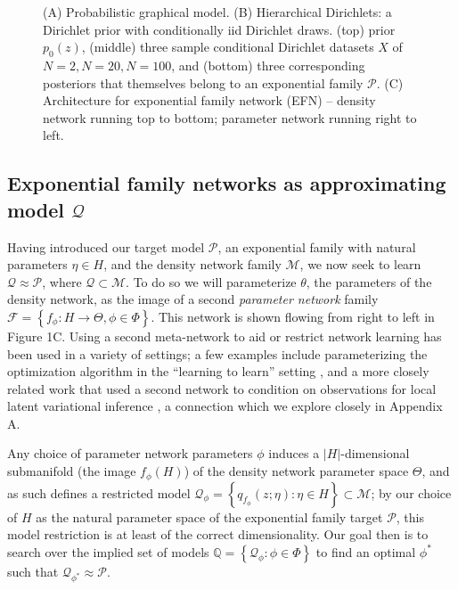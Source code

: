 \documentclass{article}
\newcommand{\inputTikZ}[2]{%
     \scalebox{#1}{}  
}
\begin{document}
\begin{figure}
 {\hspace{-.55cm} \inputTikZ{0.6}{figs/fig1/efn1b.tex}  }

  \caption{(A) Probabilistic graphical model. (B) Hierarchical Dirichlets: a Dirichlet prior with conditionally iid Dirichlet draws.  (top) prior $p_0(z)$, (middle) three sample conditional Dirichlet datasets $X$ of $N=2, N=20, N=100$, and (bottom) three corresponding posteriors that themselves belong to an exponential family $\mathcal{P}$.  (C) Architecture for exponential family network (EFN) -- density network running top to bottom; parameter network running right to left.}
\end{figure}

\subsection{Exponential family networks as approximating model $\mathcal{Q}$}

Having introduced our target model $\mathcal{P}$, an exponential family with natural parameters $\eta \in H$, and the density network family $\mathcal{M}$, we now seek to learn $\mathcal{Q} \approx \mathcal{P}$, where $\mathcal{Q} \subset \mathcal{M}$.  
To do so we will parameterize $\theta$, the parameters of the density network, as the image of a second \emph{parameter network} family $\mathcal{F} = \left\{ f_\phi : H \rightarrow \Theta, \phi \in \Phi\right\}$.   
This network is shown flowing from right to left in Figure 1C.  
Using a second meta-network to aid or restrict network learning has been used in a variety of settings; a few examples include parameterizing the optimization algorithm in the ``learning to learn'' setting \citep{andrychowicz2016learning}, and a more closely related work that used a second network to condition on observations for local latent variational inference \citep{rezende2015variational}, a connection which we explore closely in Appendix A.

Any choice of parameter network parameters $\phi$ induces a $|H|$-dimensional submanifold (the image $f_\phi(H)$) of the density network parameter space $\Theta$, and as such defines a restricted model $\mathcal{Q}_\phi = \left\{ q_{f_{\phi}}(z; \eta): \eta \in H\right\} \subset \mathcal{M}$; by our choice of $H$ as the natural parameter space of the exponential family target $\mathcal{P}$, this model restriction is at least of the correct dimensionality.
Our goal then is to search over the implied set of models $\mathbb{Q} = \left\{ \mathcal{Q}_\phi : \phi \in \Phi \right\}$ to find an optimal $\phi^*$ such that $\mathcal{Q}_{\phi^*} \approx \mathcal{P}$. 
\end{document}
